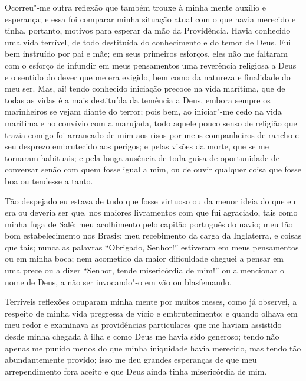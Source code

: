 Ocorreu"-me outra reflexão que também trouxe à minha mente auxílio e
esperança; e essa foi comparar minha situação atual com o que havia
merecido e tinha, portanto, motivos para esperar da mão da Providência.
Havia conhecido uma vida terrível, de todo destituída do conhecimento e
do temor de Deus. Fui bem instruído por pai e mãe; em seus primeiros
esforços, eles não me faltaram com o esforço de infundir em meus
pensamentos uma reverência religiosa a Deus e o sentido do dever que me
era exigido, bem como da natureza e finalidade do meu ser. Mas, ai!
tendo conhecido iniciação precoce na vida marítima, que de todas as
vidas é a mais destituída da temência a Deus, embora sempre os
marinheiros se vejam diante do terror; pois bem, ao iniciar"-me cedo na
vida marítima e no convívio com a marujada, todo aquele pouco senso de
religião que trazia comigo foi arrancado de mim aos risos por meus
companheiros de rancho e seu desprezo embrutecido aos perigos; e pelas
visões da morte, que se me tornaram habituais; e pela longa ausência de
toda guisa de oportunidade de conversar senão com quem fosse igual a
mim, ou de ouvir qualquer coisa que fosse boa ou tendesse a tanto.

Tão despejado eu estava de tudo que fosse virtuoso ou da menor ideia do
que eu era ou deveria ser que, nos maiores livramentos com que fui
agraciado, tais como minha fuga de Salé; meu acolhimento pelo capitão
português do navio; meu tão bom estabelecimento nos Brasis; meu
recebimento da carga da Inglaterra, e coisas que tais; nunca as palavras
``Obrigado, Senhor!'' estiveram em meus pensamentos ou em minha boca;
nem acometido da maior dificuldade cheguei a pensar em uma prece ou a
dizer ``Senhor, tende misericórdia de mim!'' ou a mencionar o nome de
Deus, a não ser invocando"-o em vão ou blasfemando.

Terríveis reflexões ocuparam minha mente por muitos meses, como já
observei, a respeito de minha vida pregressa de vício e embrutecimento;
e quando olhava em meu redor e examinava as providências particulares
que me haviam assistido desde minha chegada à ilha e como Deus me havia
sido generoso; tendo não apenas me punido menos do que minha iniquidade
havia merecido, mas tendo tão abundantemente provido; isso me deu
grandes esperanças de que meu arrependimento fora aceito e que Deus
ainda tinha misericórdia de mim.

